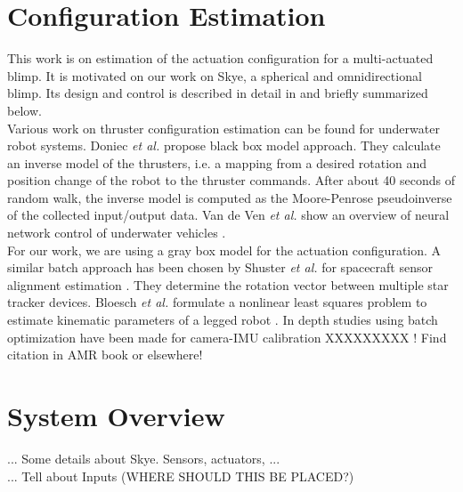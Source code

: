 \section{Configuration Estimation}
This work is on estimation of the actuation configuration for a multi-actuated blimp. It is motivated on our work on Skye, a spherical and omnidirectional blimp. Its design and control is described in detail in \citep{Skye2013} and briefly summarized below. \\
Various work on thruster configuration estimation can be found for underwater robot systems. Doniec \textit{et al.} \citep{Doniec} propose black box model approach. They calculate an inverse model of the thrusters, i.e. a mapping from a desired rotation and position change of the robot to the thruster commands. After about 40 seconds of random walk, the inverse model is computed as the Moore-Penrose pseudoinverse of the collected input/output data. Van de Ven \textit{et al.} show an overview of neural network control of underwater vehicles \cite{VandeVen2005}. \\ For our work, we are using a gray box model for the actuation configuration. A similar batch approach has been chosen by Shuster \textit{et al.} for spacecraft sensor alignment estimation \citep{Shuster1991}. They determine the rotation vector between multiple star tracker devices. Bloesch \textit{et al.} formulate a nonlinear least squares problem to estimate kinematic parameters of a legged robot \citep{Bloesch2013}. In depth studies using batch optimization have been made for camera-IMU calibration XXXXXXXXX 
! Find citation in AMR book or elsewhere!


\section{System Overview}
... Some details about Skye. Sensors, actuators, ... \cite{Skye2013}
\\
... Tell about Inputs (WHERE SHOULD THIS BE PLACED?)